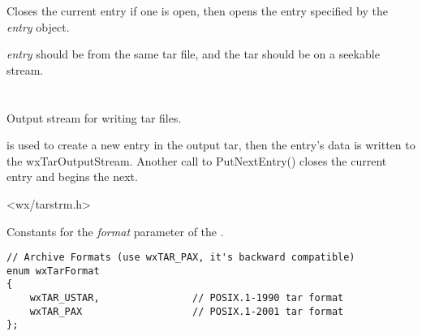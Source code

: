 \label{wxtarinputstreamopenentry}


Closes the current entry if one is open, then opens the entry specified
by the {\it entry} object.

{\it entry} should be from the same tar file, and the tar should
be on a seekable stream.




%
%

\section{}\label{wxtaroutputstream}

Output stream for writing tar files.

 is used to create
a new entry in the output tar, then the entry's data is written to the
wxTarOutputStream. Another call to PutNextEntry() closes the current
entry and begins the next.




<wx/tarstrm.h>




Constants for the {\it format} parameter of the
 .

\begin{verbatim}
// Archive Formats (use wxTAR_PAX, it's backward compatible)
enum wxTarFormat
{
    wxTAR_USTAR,                // POSIX.1-1990 tar format
    wxTAR_PAX                   // POSIX.1-2001 tar format
};

\end{verbatim}


\\
\\


